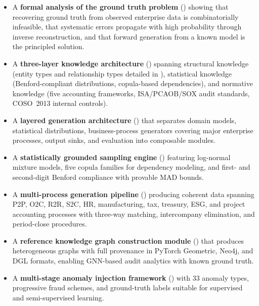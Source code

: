 \begin{itemize}
  \item A \textbf{formal analysis of the ground truth problem}
    () showing that recovering ground truth from
    observed enterprise data is combinatorially infeasible, that
    systematic errors propagate with high probability through inverse
    reconstruction, and that forward generation from a known model is
    the principled solution.

  \item A \textbf{three-layer knowledge architecture}
    () spanning structural
    knowledge (entity types and relationship types detailed in
    ), statistical knowledge (Benford-compliant
    distributions, copula-based dependencies), and normative knowledge
    (five accounting frameworks, ISA/PCAOB/SOX audit standards, COSO~2013
    internal controls).

  \item A \textbf{layered generation architecture}
    () that separates
    domain models, statistical distributions, business-process generators
    covering major enterprise processes, output sinks, and evaluation into
    composable modules.

  \item A \textbf{statistically grounded sampling engine}
    () featuring log-normal mixture
    models, five copula families for dependency modeling, and first- and
    second-digit Benford compliance with provable MAD bounds.

  \item A \textbf{multi-process generation pipeline}
    () producing coherent data spanning
    P2P, O2C, R2R, S2C, HR, manufacturing, tax, treasury, ESG, and
    project accounting processes with three-way matching, intercompany
    elimination, and period-close procedures.

  \item A \textbf{reference knowledge graph construction module}
    () that produces heterogeneous graphs with
    full provenance in PyTorch Geometric, Neo4j, and DGL formats, enabling
    GNN-based audit analytics with known ground truth.

  \item A \textbf{multi-stage anomaly injection framework}
    () with 33 anomaly types, progressive
    fraud schemes, and ground-truth labels suitable for supervised and
    semi-supervised learning.


\end{itemize}
